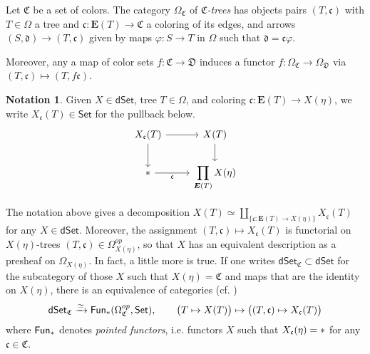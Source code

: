 \documentclass{hha}
\theoremstyle{definition} %
\newtheorem{notation}[theorem]{Notation}%
\newcommand{\Set}{\mathsf{Set}}
\newcommand{\dSet}{\mathsf{dSet}}
\newcommand{\Fun}{\mathsf{Fun}}
\begin{document}
\begin{definition}\label{CTREE_DEF}
	Let $\mathfrak C$ be a set of colors.
	The category $\Omega_{\mathfrak C}$ of \textit{$\mathfrak C$-trees} has objects pairs $(T, \mathfrak c)$ with 
	$T \in \Omega$ a tree and
	$\mathfrak c \colon \boldsymbol{E}(T) \to \mathfrak C$ a coloring of its edges,
	and arrows
	$(S, \mathfrak d) \to (T, \mathfrak c)$
	given by maps
	$\varphi \colon S \to T$ in $\Omega$ such that $\mathfrak d = \mathfrak c \varphi$.
	
	Moreover, any a map of color sets
	$f \colon \mathfrak C \to \mathfrak D$
	induces a functor
	$f\colon \Omega_{\mathfrak{C}} \to \Omega_{\mathfrak{D}}$
	via
	$(T,\mathfrak{c}) \mapsto (T,f\mathfrak{c})$.
\end{definition}



\begin{notation}\label{MAPSOVCOL NOT}
	Given $X \in \dSet$, tree $T \in \Omega$, 
	and coloring $\mathfrak c \colon \boldsymbol{E}(T) \to X(\eta)$,
	we write $X_{\mathfrak c}(T) \in \Set$ for the pullback below.
	\begin{equation}
	\label{XUDECALT EQ}
	\begin{tikzcd}
	X_{\mathfrak c}(T) \arrow[r] \arrow[d]
	&
	X(T) \arrow[d]
	\\
	\** \arrow{r}[swap]{\mathfrak c}
	&
	\displaystyle{
		\prod\limits_{\boldsymbol{E}(T)} X(\eta)
	}
	\end{tikzcd}
	\end{equation}
\end{notation}




\begin{remark}
	The notation above gives a decomposition
	$X(T) \simeq \coprod_{\{\mathfrak c \colon \boldsymbol{E}(T) \to X(\eta)\}} X_{\mathfrak c}(T)$
	for any $X\in \dSet$.
	Moreover, the assignment
	$(T,\mathfrak c) \mapsto X_{\mathfrak{c}}(T)$ 
	is functorial on
	$X(\eta)$-trees $(T,\mathfrak c) \in \Omega^{op}_{X(\eta)}$,
	so that $X$ has an equivalent description
	as a presheaf on $\Omega_{X(\eta)}$.
	In fact, a little more is true. 
	If one writes 
	$\mathsf{dSet}_{\mathfrak{C}} \subset \dSet$
	for the subcategory of those $X$ such that
	$X(\eta) = \mathfrak{C}$ and maps that are the identity on 
	$X(\eta)$, there is an equivalence of categories (cf. \cite[Eq. (3.21)]{BP_TAS})
\begin{equation}\label{DSETCID EQ}
\dSet_{\mathfrak C} \xrightarrow{\simeq}
 \Fun_{\**}(\Omega_{\mathfrak C}^{op}, \Set),
\qquad
\big(T \mapsto X(T)\big) \mapsto \big( (T, \mathfrak c) \mapsto X_{\mathfrak c}(T) \big)
\end{equation}
where $\Fun_{\**}$ denotes \emph{pointed functors},
i.e. functors $X$ such that
$X_{\mathfrak c}(\eta) = \**$
for any $\mathfrak{c} \in \mathfrak{C}$.
\end{remark}
\end{document}
